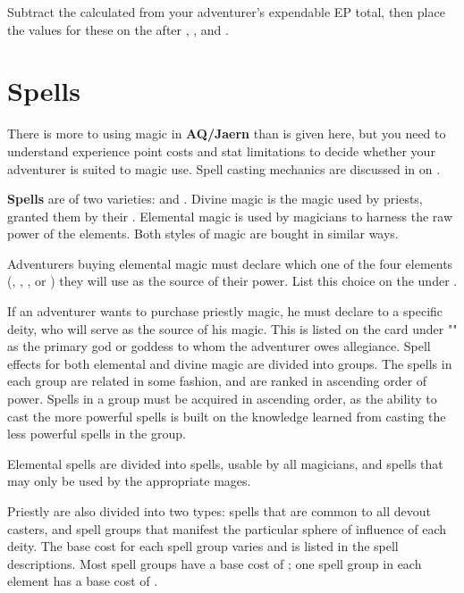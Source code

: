 \begin{multicols*}{2}
Subtract the calculated \EP from your adventurer's expendable EP total, then place the values for these on the  after , , and .
\section{Spells}
There is more to using magic in \textbf{AQ/Jaern} than is given here, but you need to understand experience point costs and stat limitations to decide whether your adventurer is suited to magic use. Spell casting mechanics are discussed in  on .

\textbf{Spells} are of two varieties:  and . Divine magic is the magic used by priests, granted them by their . Elemental magic is used by magicians to harness the raw power of the elements. Both styles of magic are bought in similar ways.

Adventurers buying elemental magic must declare which one of the four elements (, , , or ) they will use as the source of their power. List this choice on the  under .

If an adventurer wants to purchase priestly magic, he must declare  to a specific deity, who will serve as the source of his magic. This is listed on the card under "" as the primary god or goddess to whom the adventurer owes allegiance.
Spell effects for both elemental and divine magic are divided into groups. The spells in each group are related in some fashion, and are ranked in ascending order of power.
Spells in a group must be acquired in ascending order, as the ability to cast the more powerful spells is built on the knowledge learned from casting the less powerful spells in the group.

Elemental spells are divided into  spells, usable by all magicians, and  spells that may only be used by the appropriate mages.

Priestly  are also divided into two types:  spells that are common to all devout casters, and  spell groups that manifest the particular sphere of influence of each deity.
The base cost for each spell group varies and is listed in the spell descriptions. Most spell groups have a base cost of ; one spell group in each element has a base cost of .

\end{multicols*}
